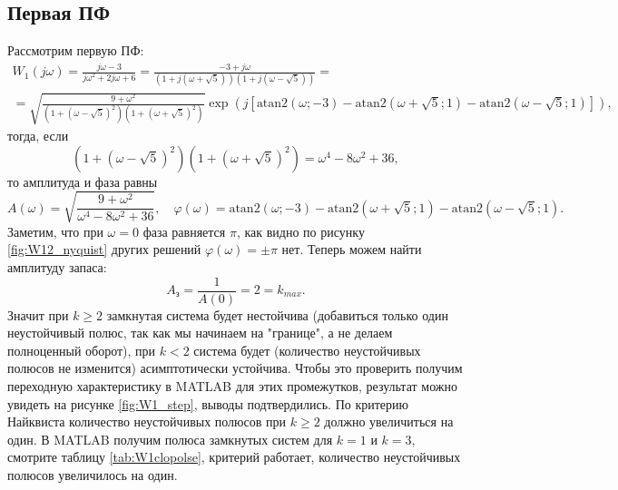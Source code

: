 \subsection{Первая ПФ}
Рассмотрим первую ПФ:
\begin{equation*}
    \begin{split}
    W_1(j\omega)=\frac{j\omega-3}{j\omega^2+2j\omega+6}
    =\frac{-3+j\omega}{(1+j(\omega+\sqrt{5}))(1+j(\omega-\sqrt{5}))}=\\
    =\sqrt{\frac{9+\omega^2}{(1+(\omega-\sqrt{5})^2)(1+(\omega+\sqrt{5})^2)}}
    \exp \left( j\left[ \text{atan2}(\omega;-3) - \text{atan2}(\omega+\sqrt 5;1) - \text{atan2}(\omega-\sqrt 5;1) \right] \right),
    \end{split}
\end{equation*}
тогда, если 
\begin{equation*}
    (1+(\omega-\sqrt{5})^2)(1+(\omega+\sqrt{5})^2)=\omega^4-8\omega^2+36,
\end{equation*}
то амплитуда и фаза равны
\begin{equation*}
    A(\omega)=\sqrt{\frac{9+\omega^2}{\omega^4-8\omega^2+36}},
    \quad \varphi(\omega)=\text{atan2}(\omega;-3) - \text{atan2}(\omega+\sqrt 5;1) - \text{atan2}(\omega-\sqrt 5;1).
\end{equation*}
Заметим, что при $\omega=0$ фаза равняется $\pi$, как видно по рисунку \ref{fig:W12_nyquist}
других решений $\varphi(\omega)=\pm\pi$ нет. Теперь можем найти амплитуду запаса:
\begin{equation*}
    A_\text{з}=\frac{1}{A(0)}=2=k_{max}.
\end{equation*}
Значит при $k\geq 2$ замкнутая система будет нестойчива (добавиться только один неустойчивый полюс,
так как мы начинаем на "границе", а не делаем полноценный оборот), 
при $k<2$ система будет (количество неустойчивых полюсов не изменится)
асимптотически устойчива. Чтобы это проверить получим переходную характеристику
в MATLAB для этих промежутков, результат можно увидеть на рисунке \ref{fig:W1_step},
выводы подтвердились. По критерию Найквиста количество неустойчивых полюсов при $k\geq2$
должно увеличиться на один. В MATLAB получим полюса замкнутых систем для $k=1$ и $k=3$,
смотрите таблицу \ref{tab:W1clopolse},
критерий работает, количество неустойчивых полюсов увеличилось на один.

